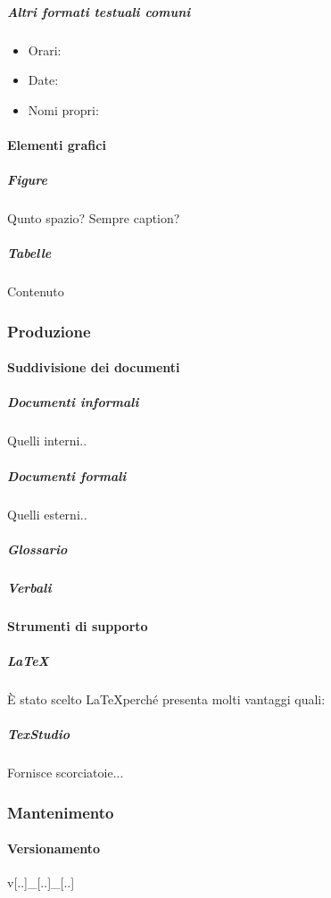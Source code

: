 			\subparagraph{Altri formati testuali comuni} %
			\begin{itemize}
				\item Orari:
				\item Date:
				\item Nomi propri:
			\end{itemize}



			\paragraph{Elementi grafici}

			\subparagraph{Figure}
			Qunto spazio? Sempre caption?

			\subparagraph{Tabelle}
			Contenuto



		\subsubsection{Produzione}

			\paragraph{Suddivisione dei documenti}

			\subparagraph{Documenti informali}
			Quelli interni..

			\subparagraph{Documenti formali}
			Quelli esterni..

			\subparagraph{Glossario}

			\subparagraph{Verbali}



			\paragraph{Strumenti di supporto}

			\subparagraph{\LaTeX}
			È stato scelto \LaTeX perché presenta molti vantaggi quali:

			\subparagraph{TexStudio}
			Fornisce scorciatoie...


		\subsubsection{Mantenimento}

			\paragraph{Versionamento}
			v[..]\_[..]\_[..]	%

